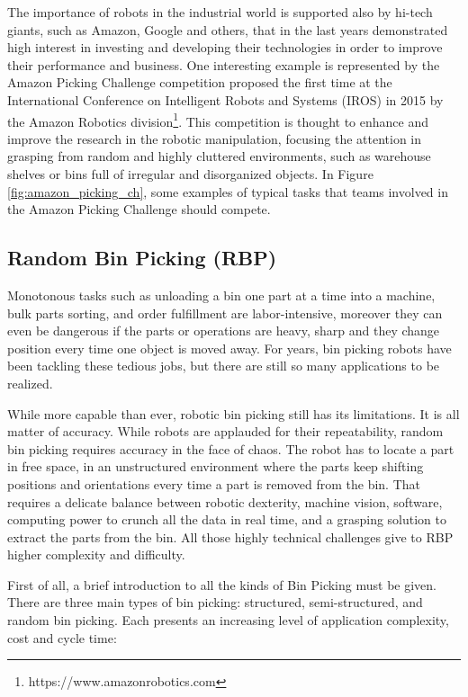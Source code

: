 The importance of robots in the industrial world is supported also by hi-tech giants, such as Amazon, Google and others, that in the last years demonstrated high interest in investing and developing their technologies in order to improve their performance and business. One interesting example is represented by the Amazon Picking Challenge competition proposed the first time at the International Conference on Intelligent Robots and Systems (IROS) in 2015 by the Amazon Robotics division\footnote{https://www.amazonrobotics.com}. This competition is thought to enhance and improve the research in the robotic manipulation, focusing the attention in grasping from random and highly cluttered environments, such as warehouse shelves or bins full of irregular and disorganized objects. In Figure \ref{fig:amazon_picking_ch}, some examples of typical tasks that teams involved in the Amazon Picking Challenge should compete.

\subsection{Random Bin Picking (RBP)}\label{subsec:binpicking}
Monotonous tasks such as unloading a bin one part at a time into a machine, bulk parts sorting, and order fulfillment are labor-intensive, moreover they can even be dangerous if the parts or operations are heavy, sharp and they change position every time one object is moved away. For years, bin picking robots have been tackling these tedious jobs, but there are still so many applications to be realized.

While more capable than ever, robotic bin picking still has its limitations. It is all matter of accuracy. While robots are applauded for their repeatability, random bin picking requires accuracy in the face of chaos. The robot has to locate a part in free space, in an unstructured environment where the parts keep shifting positions and orientations every time a part is removed from the bin. That requires a delicate balance between robotic dexterity, machine vision, software, computing power to crunch all the data in real time, and a grasping solution to extract the parts from the bin. All those highly technical challenges give to RBP higher complexity and difficulty.

First of all, a brief introduction to all the kinds of Bin Picking must be given. There are three main types of bin picking: structured, semi-structured, and random bin picking. Each presents an increasing level of application complexity, cost and cycle time:

